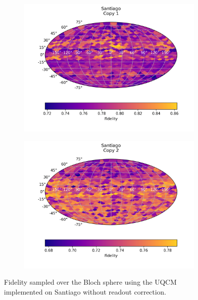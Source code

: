 \begin{figure}[H]
    \centering
    \begin{subfigure}{.5\textwidth}
      \centering
      \includegraphics[width=\textwidth]{Figures/UQCM/IBM/FullSphere/results_santiago_copy1.png}
    \end{subfigure}%
    \begin{subfigure}{.5\textwidth}
      \centering
      \includegraphics[width=\textwidth]{Figures/UQCM/IBM/FullSphere/results_santiago_copy2.png}
    \end{subfigure}
    \caption{Fidelity sampled over the Bloch sphere using the UQCM implemented on Santiago without readout correction.}
\end{figure}

